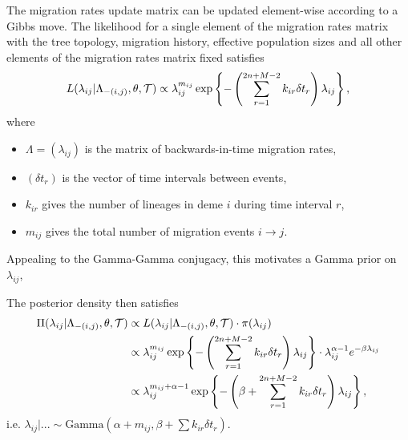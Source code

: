 The migration rates update matrix can be updated element-wise according to a Gibbs move. The likelihood for a single element of the migration rates matrix with the tree topology, migration history, effective population sizes and all other elements of the migration rates matrix fixed satisfies
	\[
		L(\lambda_{ij} | \Lambda_{-(i,j)}, \theta, \mathcal{T}) \propto \lambda_{ij}^{m_{ij}} \exp \left\{ - \left(\sum_{r=1}^{2n + M - 2} k_{ir} \delta t_r \right) \lambda_{ij} \right\},
	\]
where
	\begin{itemize}
		\item $\Lambda = (\lambda_{ij})$ is the matrix of backwards-in-time migration rates,
		\item $(\delta t_r)$ is the vector of time intervals between events,
		\item $k_{ir}$ gives the number of lineages in deme $i$ during time interval $r$,
		\item $m_{ij}$ gives the total number of migration events $i \rightarrow j$.
	\end{itemize}

Appealing to the Gamma-Gamma conjugacy, this motivates a Gamma prior on $\lambda_{ij}$, 


The posterior density then satisfies
	\begin{align*}
		\Pi(\lambda_{ij} | \Lambda_{-(i,j)}, \theta, \mathcal{T}) & \propto L(\lambda_{ij} | \Lambda_{-(i,j)}, \theta, \mathcal{T}) \cdot \pi(\lambda_{ij}) \\
			& \propto \lambda_{ij}^{m_{ij}} \exp \left\{ - \left(\sum_{r=1}^{2n + M - 2} k_{ir} \delta t_r \right) \lambda_{ij} \right\} \cdot \lambda_{ij}^{\alpha - 1} e^{-\beta \lambda_{ij}} \\
			& \propto \lambda_{ij}^{m_{ij} + \alpha - 1} \exp \left\{ - \left( \beta + \sum_{r=1}^{2n + M - 2} k_{ir} \delta t_r \right) \lambda_{ij} \right\},
	\end{align*}
i.e. $\lambda_{ij} | ... \sim \text{Gamma} \left( \alpha + m_{ij}, \beta + \sum k_{ir} \delta t_r \right)$.


